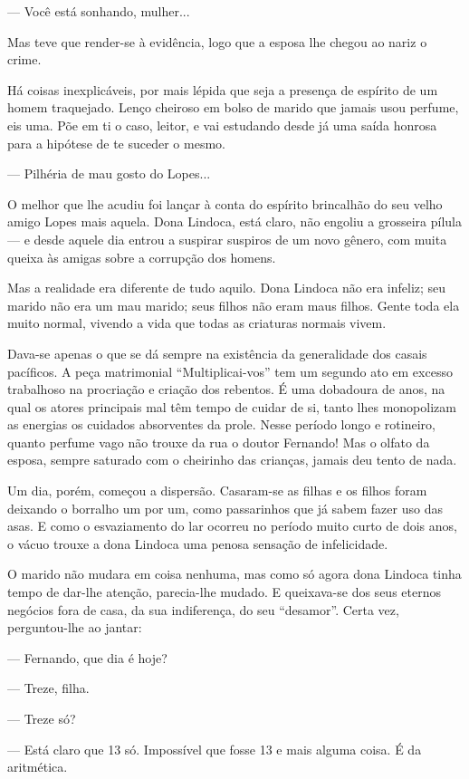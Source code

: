 --- Você está sonhando, mulher...

Mas teve que render-se à evidência, logo que a esposa lhe chegou ao
nariz o crime.

Há coisas inexplicáveis, por mais lépida que seja a presença de espírito
de um homem traquejado. Lenço cheiroso em bolso de marido que jamais
usou perfume, eis uma. Põe em ti o caso, leitor, e vai estudando desde
já uma saída honrosa para a hipótese de te suceder o mesmo.

--- Pilhéria de mau gosto do Lopes...

O melhor que lhe acudiu foi lançar à conta do espírito brincalhão do seu
velho amigo Lopes mais aquela. Dona Lindoca, está claro, não engoliu a
grosseira pílula --- e desde aquele dia entrou a suspirar suspiros de um
novo gênero, com muita queixa às amigas sobre a corrupção dos homens.

Mas a realidade era diferente de tudo aquilo. Dona Lindoca não era
infeliz; seu marido não era um mau marido; seus filhos não eram maus
filhos. Gente toda ela muito normal, vivendo a vida que todas as
criaturas normais vivem.

Dava-se apenas o que se dá sempre na existência da generalidade dos
casais pacíficos. A peça matrimonial ``Multiplicai-vos'' tem um segundo
ato em excesso trabalhoso na procriação e criação dos rebentos. É uma
dobadoura de anos, na qual os atores principais mal têm tempo de cuidar
de si, tanto lhes monopolizam as energias os cuidados absorventes da
prole. Nesse período longo e rotineiro, quanto perfume vago não trouxe
da rua o doutor Fernando! Mas o olfato da esposa, sempre saturado com o
cheirinho das crianças, jamais deu tento de nada.

Um dia, porém, começou a dispersão. Casaram-se as filhas e os filhos
foram deixando o borralho um por um, como passarinhos que já sabem fazer
uso das asas. E como o esvaziamento do lar ocorreu no período muito
curto de dois anos, o vácuo trouxe a dona Lindoca uma penosa sensação de
infelicidade.

O marido não mudara em coisa nenhuma, mas como só agora dona Lindoca
tinha tempo de dar-lhe atenção, parecia-lhe mudado. E queixava-se dos
seus eternos negócios fora de casa, da sua indiferença, do seu
``desamor''. Certa vez, perguntou-lhe ao jantar:

--- Fernando, que dia é hoje?

--- Treze, filha.

--- Treze só?

--- Está claro que 13 só. Impossível que fosse 13 e mais alguma coisa. É
da aritmética.

